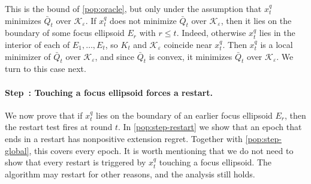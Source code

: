 \documentclass[12pt,cleveref]{jmlr}
\newcounter{popstep}
\newcommand{\popstep}[1]{\refstepcounter{popstep}\paragraph{Step~\thepopstep: #1}}
\newcommand{\K}{\mathcal K}
\newcommand{\1}{\mathbf 1}
\newcommand{\eps}{\varepsilon}
\begin{document}
This is the bound of \cref{pop:oracle}, but only under the assumption that $x^q_t$ minimizes $\bar Q_t$ over $\K_\eps$.
If $x^q_t$ does not minimize $\bar Q_t$ over $\K_\eps$, then it lies on the boundary of some focus ellipsoid $E_r$ with $r\leq t$.
Indeed, otherwise $x^q_t$ lies in the interior of each of $E_1,\ldots,E_t$, so $K_t$ and $\K_\eps$ coincide near $x^q_t$. Then $x^q_t$ is a local minimizer of $\bar Q_t$ over $\K_\eps$, and since $\bar Q_t$ is convex, it minimizes $\bar Q_t$ over $\K_\eps$.
We turn to this case next.

\popstep{Touching a focus ellipsoid forces a restart.}\label{pop:step-touch}
We now prove that if $x^q_t$ lies on the boundary of an earlier focus ellipsoid $E_r$, then the restart test fires at round $t$.
In \cref{pop:step-restart} we show that an epoch that ends in a restart has nonpositive extension regret.
Together with \cref{pop:step-global}, this covers every epoch.
It is worth mentioning that we do not need to show that every restart is triggered by $x^q_t$ touching a focus ellipsoid.
The algorithm may restart for other reasons, and the analysis still holds.
\end{document}
